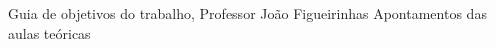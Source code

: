 \documentclass[9pt]{extarticle}
\begin{document}
\begin{multicols}{2}
\begin{thebibliography}{9}

 Guia de objetivos do trabalho, Professor João Figueirinhas
 Apontamentos das aulas teóricas
\end{thebibliography}

\vfill

\pagebreak

%

\end{multicols}
\end{document}
